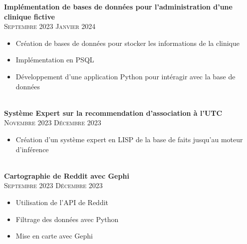 \documentclass[oneside]{article}
\begin{document}
{\begin{minipage}[t][\dimexpr\textheight-2\fboxrule-2\fboxsep\relax][t]{\dimexpr0.7\textwidth-2\fboxrule-2\fboxsep\relax}
        \vspace{-\baselineskip}
        \vspace{0.3cm}

        {\large \textbf{Implémentation de bases de données pour l'administration d'une clinique fictive}} \\
        {\scshape{}\selectfont\footnotesize Septembre 2023 \textendash{} Janvier 2024} \\
        \vspace{-\baselineskip}
        \vspace{0.2cm}
        \begin{itemize}
            \setlength{\itemsep}{-5pt}
            \item Création de bases de données pour stocker les informations de la clinique
            \item Implémentation en PSQL
            \item Développement d'une application Python pour intéragir avec la base de données
        \end{itemize}\\

        {\large \textbf{Système Expert sur la recommendation d'association à l'UTC}} \\
        {\scshape{}\selectfont\footnotesize Novembre 2023 \textendash{} Décembre 2023} \\
        \vspace{-\baselineskip}
        \vspace{0.2cm}
        \begin{itemize}
            \setlength{\itemsep}{-5pt}
            \item Création d'un système expert en LISP de la base de faits jusqu'au moteur d'inférence
        \end{itemize}\\
        
        {\large \textbf{Cartographie de Reddit avec Gephi}} \\
        {\scshape{}\selectfont\footnotesize Septembre 2023 \textendash{} Décembre 2023} \\
        \vspace{-\baselineskip}
        \vspace{0.2cm}
        \begin{itemize}
            \setlength{\itemsep}{-5pt}
            \item Utilisation de l'API de Reddit
            \item Filtrage des données avec Python
            \item Mise en carte avec Gephi
        \end{itemize}\\


\end{minipage}}
\end{document}
